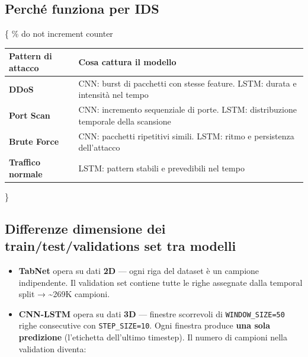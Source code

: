 \subsection{Perché funziona per IDS}\label{perchuxe9-funziona-per-ids}

\{\def\LTcaptype{none} \% do not increment counter

\begin{longtable}[]{@{}
  >{\raggedright\arraybackslash}p{}
  >{\raggedright\arraybackslash}p{}@{}}
\toprule\noalign{}
\begin{minipage}[b]{\linewidth}\raggedright
Pattern di attacco
\end{minipage} & \begin{minipage}[b]{\linewidth}\raggedright
Cosa cattura il modello
\end{minipage} \\
\midrule\noalign{}
\endhead
\bottomrule\noalign{}
\endlastfoot
\textbf{DDoS} & CNN: burst di pacchetti con stesse feature. LSTM: durata e intensità nel tempo \\
\textbf{Port Scan} & CNN: incremento sequenziale di porte. LSTM: distribuzione temporale della scansione \\
\textbf{Brute Force} & CNN: pacchetti ripetitivi simili. LSTM: ritmo e persistenza dell'attacco \\
\textbf{Traffico normale} & LSTM: pattern stabili e prevedibili nel tempo \\
\end{longtable}

\}



\subsection{Differenze dimensione dei train/test/validations set tra modelli}
\begin{itemize}
\item
  \textbf{TabNet} opera su dati \textbf{2D} --- ogni riga del dataset è un campione indipendente. Il validation set contiene tutte le righe assegnate dalla temporal split → \textasciitilde269K campioni.
\item
  \textbf{CNN-LSTM} opera su dati \textbf{3D} --- finestre scorrevoli di \texttt{WINDOW\_SIZE=50} righe consecutive con \texttt{STEP\_SIZE=10}. Ogni finestra produce \textbf{una sola predizione} (l'etichetta dell'ultimo timestep). Il numero di campioni nella validation diventa:
\end{itemize}

